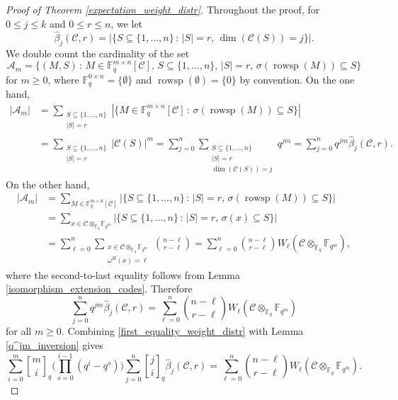 \documentclass[11pt,a4paper,reqno,twoside]{article}
\theoremstyle{definition}
\newcommand{\F}{\mathbb{F}}
\newcommand{\mC}{\mathcal{C}}
\newcommand{\qbinom}[2]{\genfrac{[}{]}{0pt}{}{#1}{#2}}
\begin{document}
\begin{proof}[Proof of Theorem \ref{expectation_weight_distr}]
Throughout the proof, for $0 \le j \le k$ and $0 \le r \le n$, we let
\[
\widehat{\beta}_j(\mC,r) = |\{ S \subseteq \{1, \dots, n\} \, : \, |S| = r, \, \dim(\mC(S)) = j \}| .
\]
We double count the cardinality of the set 
\[
\mathcal{A}_m=\{ (M,S) \, : \, M \in \F_q^{m \times n} [\mC] , \, S \subseteq \{1, \dots, n\} ,\,  |S| = r, \, \sigma(\operatorname{rowsp}(M)) \subseteq S \}
\] 
for $m \ge 0$, where $\F_q^{0 \times n}=\{\emptyset\}$ and $\operatorname{rowsp}(\emptyset)=\{0\}$ by convention. On the one hand,
\[
\begin{split}
    |\mathcal{A}_m| &= \sum_{\substack{S \subseteq \{1, \dots, n\} \\ |S| = r}} |\{ M \in \F_q^{m \times n} [\mC] \, : \, \sigma(\operatorname{rowsp}(M)) \subseteq S \}| \\
    &= \sum_{\substack{S \subseteq \{1, \dots, n\} \\ |S| = r}} |\mC(S)|^m = \sum_{j=0}^n \sum_{\substack{S \subseteq \{1, \dots, n\} \\ |S| = r \\ \dim(\mC(S)) = j}} q^{jm} = \sum_{j=0}^n q^{jm} \widehat{\beta}_j(\mC,r).
\end{split}
\]
On the other hand,
\[
\begin{split}
    |\mathcal{A}_m|   &= \sum_{M \in \F_q^{m \times n} [\mC]} |\{ S \subseteq \{1, \dots, n\}\, : \,   |S| = r, \, \sigma(\operatorname{rowsp}(M)) \subseteq S \}| \\
    &= \sum_{x \in \mC \otimes_{\F_q} \F_{q^m}} |\{ S \subseteq \{1, \dots, n\}\, : \,   |S| = r, \, \sigma(x) \subseteq S \}| \\
    &= \sum_{\ell=0}^n \sum_{\substack{x \in \mC \otimes_{\F_q} \F_{q^m} \\ \omega^H(x) = \ell}} \binom{n-\ell}{r - \ell} = \sum_{\ell=0}^n \binom{n-\ell}{r - \ell}  W_{\ell}(\mC \otimes_{\F_q}  \F_{q^m}),
\end{split}
\]
where the second-to-last equality follows from Lemma \ref{isomorphism_extension_codes}.
Therefore
\begin{equation} \label{first_equality_weight_distr}
    \sum_{j=0}^n q^{jm} \widehat{\beta}_j(\mC,r) = \sum_{\ell=0}^n \binom{n-\ell}{r - \ell}  W_{\ell}(\mC \otimes_{\F_q} \F_{q^m})
\end{equation}
for all $m \ge 0$. 
Combining \eqref{first_equality_weight_distr} with Lemma \ref{q^jm_inversion}  gives
\[
    \sum_{i=0}^m \qbinom{m}{i}_q \Bigg(\prod_{s=0}^{i-1} (q^i - q^s) \Bigg) \sum_{j=0}^n  \qbinom{j}{i}_q    \widehat{\beta}_j(\mC,r) = \sum_{\ell=0}^n \binom{n-\ell}{r - \ell}  W_{\ell}(\mC \otimes_{\F_q} \F_{q^m}).
\]
\end{proof}
\end{document}
